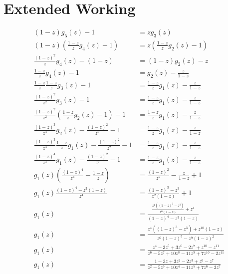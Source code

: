 \documentclass[a4paper]{article}
\theoremstyle{definition}
\theoremstyle{definition}
\theoremstyle{definition}
\begin{document}
\appendix
\section{Extended Working}

\begin{align*}
    (1 - z)g_5(z) - 1 &= zg_3(z) \\
    (1 - z)\left(\frac{1 - z}{z}g_4(z) - 1\right)
        &= z\left(\frac{1 - z}{z}g_2(z) - 1\right) \\
    \frac{(1 - z)^2}{z}g_4(z) - (1 - z) &= (1 - z)g_2(z) - z \\
    \frac{1 - z}{z}g_4(z) - 1 &= g_2(z) - \frac{z}{1 - z} \\
    \frac{1 - z}{z}\frac{1 - z}{z}g_3(z) - 1 &= \frac{1 - z}{z}g_1(z) - \frac{z}{1 - z} \\
    \frac{(1 - z)^2}{z^2}g_3(z) - 1 &= \frac{1 - z}{z}g_1(z) - \frac{z}{1 - z} \\
    \frac{(1 - z)^2}{z^2}\left(\frac{1 - z}{z}g_2(z) - 1\right) - 1
        &= \frac{1 - z}{z}g_1(z) - \frac{z}{1 - z} \\
    \frac{(1 - z)^3}{z^3}g_2(z) - \frac{(1 - z)^2}{z^2} - 1
        &= \frac{1 - z}{z}g_1(z) - \frac{z}{1 - z} \\
    \frac{(1 - z)^3}{z^3}\frac{1 - z}{z}g_1(z) - \frac{(1 - z)^2}{z^2} - 1
        &= \frac{1 - z}{z}g_1(z) - \frac{z}{1 - z} \\
    \frac{(1 - z)^4}{z^4}g_1(z) - \frac{(1 - z)^2}{z^2} - 1
        &= \frac{1 - z}{z}g_1(z) - \frac{z}{1 - z} \\
    g_1(z)\left(\frac{(1 - z)^4}{z^4} - \frac{1 - z}{z}\right)
        &= \frac{(1 - z)^2}{z^2} - \frac{z}{1 - z} + 1 \\
    g_1(z)\frac{(1 - z)^4 - z^3(1 - z)}{z^4}
        &= \frac{(1 - z)^3 - z^3}{z^2(1 - z)} + 1 \\
    g_1(z)
        &= \frac{\frac{z^4((1 - z)^3 - z^3)}{z^6(1 - z)} + z^4}
        {(1 - z)^4 - z^3(1 - z)} \\
    g_1(z)
        &= \frac{z^4((1 - z)^3 - z^3) + z^{10}(1 - z)}
        {z^6(1 - z)^5 - z^9(1 - z)^2} \\
    g_1(z)
        &= \frac{z^4 - 3z^5 + 3z^6 - 2z^7 + z^{10} - z^{11}}
        {z^6 - 5z^7 + 10z^8 - 11z^9 + 7z^{10} - 2z^{11}} \\
    g_1(z)
        &= \frac{1 - 3z + 3z^2 - 2z^3 + z^6 - z^7}
        {z^2 - 5z^3 + 10z^4 - 11z^5 + 7z^6 - 2z^7} \\
\end{align*}

\end{document}
